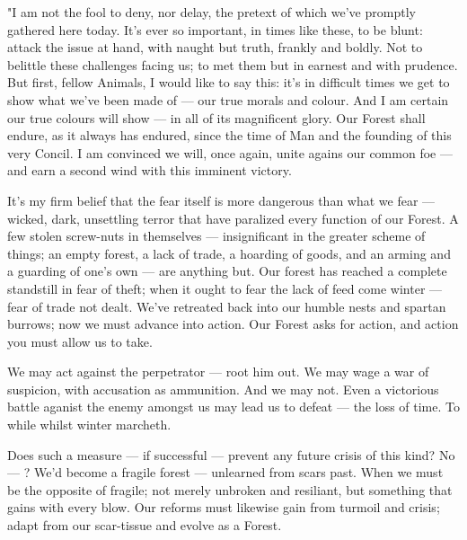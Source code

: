 
"I am not the fool to deny, nor delay, the pretext of which we've promptly gathered here today. It's ever so important, in times like these, to be blunt: attack the issue at hand, with naught but truth, frankly and boldly. Not to belittle these challenges facing us; to met them but in earnest and with prudence.
But first, fellow Animals, I would like to say this: it's in difficult times we get to show what we've been made of — our true morals and colour. And I am certain our true colours will show — in all of its magnificent glory. Our Forest shall endure, as it always has endured, since the time of Man and the founding of this very Concil. I am convinced we will, once again, unite agains our common foe — and earn a second wind with this imminent victory.

It's my firm belief that the fear itself is more dangerous than what we fear — wicked, dark, unsettling terror that have paralized every function of our Forest. A few stolen screw-nuts in themselves — insignificant in the greater scheme of things; an empty forest, a lack of trade, a hoarding of goods, and an arming and a guarding of one's own — are anything but. Our forest has reached a complete standstill in fear of theft; when it ought to fear the lack of feed come winter — fear of trade not dealt. We've retreated back into our humble nests and spartan burrows; now we must advance into action. Our Forest asks for action, and action you must allow us to take.


We may act against the perpetrator — root him out. We may wage a war of suspicion, with accusation as ammunition. And we may not. Even a victorious battle aganist the enemy amongst us may lead us to defeat — the loss of time. To while whilst winter marcheth.

Does such a measure — if successful — prevent any future crisis of this kind? No — ? We'd become a fragile forest — unlearned from scars past. When we must be the opposite of fragile; not merely unbroken and resiliant, but something that gains with every blow. 
Our reforms must likewise gain from turmoil and crisis; adapt from our scar-tissue and evolve as a Forest.


